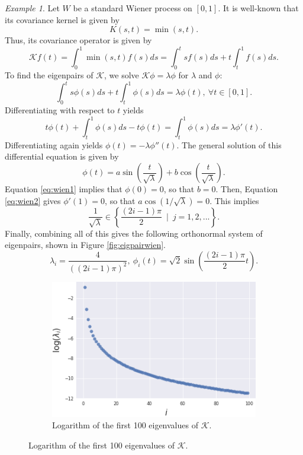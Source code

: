 \documentclass[10pt, a4paper]{report}
\newcommand{\K}[0]{\mathcal{K}}
\theoremstyle{definition}
\theoremstyle{remark}
\newtheorem{ex}{Example}
\begin{document}
\begin{ex}
	Let $W$ be a standard Wiener process on $[0,1]$. It is well-known that its covariance kernel is given by 
	$$K(s,t) = \min(s,t).$$
	Thus, its covariance operator is given by 
	$$\K f(t) = \int_{0}^1 \min(s,t)f(s)ds = \int_{0}^{t}sf(s)ds + t\int_{t}^1f(s)ds.$$
	To find the eigenpairs of $\K$, we solve $\K\phi = \lambda\phi$ for $\lambda$ and $\phi$:
	\begin{equation}\label{eq:wien1}
		\int_{0}^{t}s\phi(s)ds + t\int_{t}^1\phi(s)ds = \lambda\phi(t), \ \forall t \in [0,1].
	\end{equation}
	Differentiating with respect to $t$ yields
	\begin{equation}\label{eq:wien2}
		t\phi(t) + \int_{t}^{1}\phi(s)ds - t\phi(t) = \int_{t}^{1}\phi(s)ds = \lambda\phi'(t).	
	\end{equation}
	Differentiating again yields $\phi(t) = -\lambda\phi''(t)$. The general solution of this differential equation is given by
	$$\phi(t) = a\sin\left(\frac{t}{\sqrt{\lambda}}\right) + b\cos\left(\frac{t}{\sqrt{\lambda}}\right).$$
	Equation \ref{eq:wien1} implies that $\phi(0)=0$, so that $b=0$. Then, Equation \ref{eq:wien2} gives $\phi'(1)=0$, so that $a\cos(1/\sqrt{\lambda})=0$. This implies
	$$\frac{1}{\sqrt{\lambda}} \in \left\{\frac{(2i-1)\pi}{2} \ \mid \ j=1,2,... \right\}.$$
	Finally, combining all of this gives the following orthonormal system of eigenpairs, shown in Figure \ref{fig:eigpairwien}. 
	$$\lambda_i = \frac{4}{((2i-1)\pi)^2}, \ \phi_i(t) = \sqrt{2}\sin\left(\frac{(2i-1)\pi}{2} t\right).$$
	\begin{figure}[H]
		\centering
		\begin{subfigure}{.5\textwidth}
			\centering
			\includegraphics[width=.9\linewidth]{Code/images/12/eigvals}
			\caption{Logarithm of the first 100 eigenvalues of $\K$.}

\end{subfigure}
\end{figure}
\end{ex}
\end{document}
